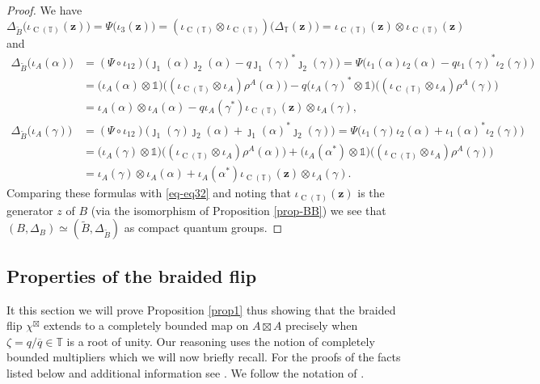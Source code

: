 \documentclass[12pt,reqno,a4paper]{amsart}
\theoremstyle{definition}
\newcommand{\comp}{\circ}
\newcommand{\I}{\mathds{1}}
\newcommand{\tens}{\otimes}
\newcommand{\TT}{\mathbb{T}}
\newcommand{\bz}{{\boldsymbol{z}}}
\DeclareMathOperator{\C}{C}
\numberwithin{equation}{section}
\begin{document}
\begin{appendices}
\begin{proof}
We have
\[
\Delta_{\widetilde{B}}\bigl(\iota_{\C(\TT)}(\bz))
=\Psi\bigl(\iota_3(\bz)\bigr)
=(\iota_{\C(\TT)}\tens\iota_{\C(\TT)})\bigl(\Delta_{\TT}(\bz)\bigr)
=\iota_{\C(\TT)}(\bz)\tens\iota_{\C(\TT)}(\bz)
\]
and
\[
\begin{aligned}
\Delta_{\widetilde{B}}\bigl(\iota_A(\alpha)\bigr)
&=(\Psi\comp\iota_{12})\bigl(\jmath_1(\alpha)\jmath_2(\alpha)-q\jmath_1(\gamma)^*\jmath_2(\gamma)\bigr)
=\Psi\bigl(\iota_1(\alpha)\iota_2(\alpha)-q\iota_1(\gamma)^*\iota_2(\gamma)\bigr)\\&=\bigl(\iota_A(\alpha)\tens\I\bigr)\bigl((\iota_{\C(\TT)}\tens\iota_A)\rho^A(\alpha)\bigr)
-q\bigl(\iota_A(\gamma)^*\tens\I\bigr)\bigl((\iota_{\C(\TT)}\tens\iota_A)\rho^A(\gamma)\bigr)\\
&=\iota_A(\alpha)\tens\iota_A(\alpha)-q\iota_A(\gamma^*)\iota_{\C(\TT)}(\bz)\tens\iota_A(\gamma),\\
\Delta_{\widetilde{B}}\bigl(\iota_A(\gamma)\bigr)
&=(\Psi\comp\iota_{12})\bigl(\jmath_1(\gamma)\jmath_2(\alpha)+\jmath_1(\alpha)^*\jmath_2(\gamma)\bigr)
=\Psi\bigl(\iota_1(\gamma)\iota_2(\alpha)+\iota_1(\alpha)^*\iota_2(\gamma)\bigr)\\
&=\bigl(\iota_A(\gamma)\tens\I\bigr)\bigl((\iota_{\C(\TT)}\tens\iota_A)\rho^A(\alpha)\bigr)
+\bigl(\iota_A(\alpha^*)\tens\I\bigr)
\bigl((\iota_{\C(\TT)}\tens\iota_A)\rho^A(\gamma)\bigr)\\
&=\iota_A(\gamma)\tens\iota_A(\alpha)+\iota_A(\alpha^*)\iota_{\C(\TT)}(\bz)\tens\iota_A(\gamma).
\end{aligned}
\]
Comparing these formulas with \eqref{eq-eq32} and noting that $\iota_{\C(\TT)}(\bz)$ is the generator $z$ of $B$ (via the isomorphism of Proposition \ref{prop-BB}) we see that $(B,\Delta_B)\simeq (\widetilde{B},\Delta_{\widetilde{B}})$ as compact quantum groups.
\end{proof}

\subsection{Properties of the braided flip}\label{app-BraidedFlip}

It this section we will prove Proposition \ref{prop1} thus showing that the braided flip $\chi^\boxtimes$ extends to a completely bounded map on $A\boxtimes A$ precisely when $\zeta=q/\overline{q}\in\TT$ is a root of unity. Our reasoning uses the notion of completely bounded multipliers which we will now briefly recall. For the proofs of the facts listed below and additional information see \cite{HuNeufangRuan,JungeNeufangRuan,CrannInner,DKV24}. We follow the notation of \cite{DKV24}.


\end{appendices}
\end{document}
